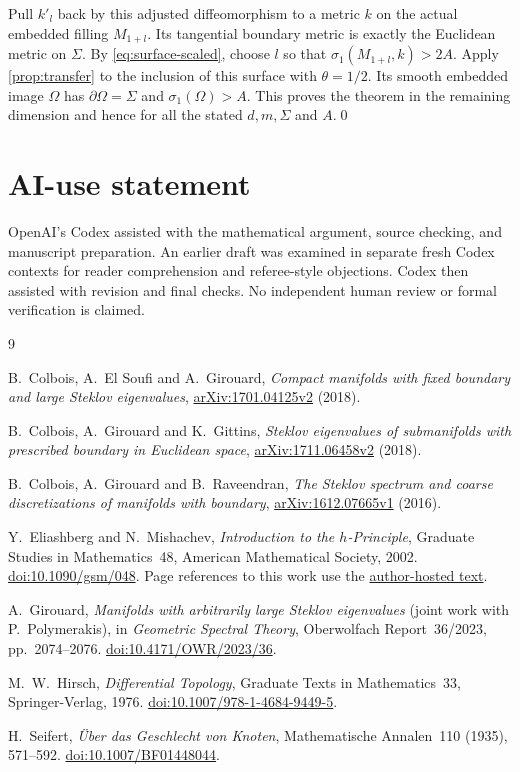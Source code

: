 \documentclass[11pt]{article}
\theoremstyle{remark}
\begin{document}
Pull $k'_l$ back by this adjusted diffeomorphism to a metric $k$ on
the actual embedded filling $M_{1+l}$. Its tangential boundary metric
is exactly the Euclidean metric on $\Sigma$. By
\eqref{eq:surface-scaled}, choose $l$ so that $\sigma_1(M_{1+l},k)>2A$.
Apply \cref{prop:transfer} to the inclusion of this surface with
$\theta=1/2$. Its smooth embedded image $\Omega$ has
$\partial\Omega=\Sigma$ and $\sigma_1(\Omega)>A$.
This proves the theorem in the remaining dimension and hence for all
the stated $d,m,\Sigma$ and $A$.\qed

\section*{AI-use statement}
OpenAI's Codex assisted with the mathematical argument, source checking,
and manuscript preparation. An earlier draft was examined in separate
fresh Codex contexts for reader comprehension and referee-style
objections. Codex then assisted with revision and final checks.
No independent human review or formal verification is claimed.

\begin{thebibliography}{9}

B.~Colbois, A.~El Soufi and A.~Girouard,
\emph{Compact manifolds with fixed boundary and large Steklov eigenvalues},
\href{https://arxiv.org/abs/1701.04125v2}{arXiv:1701.04125v2} (2018).

B.~Colbois, A.~Girouard and K.~Gittins,
\emph{Steklov eigenvalues of submanifolds with prescribed boundary in
Euclidean space},
\href{https://arxiv.org/abs/1711.06458v2}{arXiv:1711.06458v2} (2018).

B.~Colbois, A.~Girouard and B.~Raveendran,
\emph{The Steklov spectrum and coarse discretizations of manifolds with
boundary},
\href{https://arxiv.org/abs/1612.07665v1}{arXiv:1612.07665v1} (2016).

Y.~Eliashberg and N.~Mishachev,
\emph{Introduction to the $h$-Principle},
Graduate Studies in Mathematics~48, American Mathematical Society, 2002.
\href{https://doi.org/10.1090/gsm/048}{doi:10.1090/gsm/048}.
Page references to this work use the
\href{https://virtualmath1.stanford.edu/~eliash/Public/257B-2020/intro.pdf}{author-hosted text}.

A.~Girouard,
\emph{Manifolds with arbitrarily large Steklov eigenvalues}
(joint work with P.~Polymerakis), in \emph{Geometric Spectral Theory},
Oberwolfach Report~36/2023, pp.~2074--2076.
\href{https://doi.org/10.4171/OWR/2023/36}{doi:10.4171/OWR/2023/36}.

M.~W.~Hirsch,
\emph{Differential Topology},
Graduate Texts in Mathematics~33, Springer-Verlag, 1976.
\href{https://doi.org/10.1007/978-1-4684-9449-5}{doi:10.1007/978-1-4684-9449-5}.

H.~Seifert,
\emph{\"Uber das Geschlecht von Knoten},
Mathematische Annalen~110 (1935), 571--592.
\href{https://doi.org/10.1007/BF01448044}{doi:10.1007/BF01448044}.

\end{thebibliography}
\end{document}
